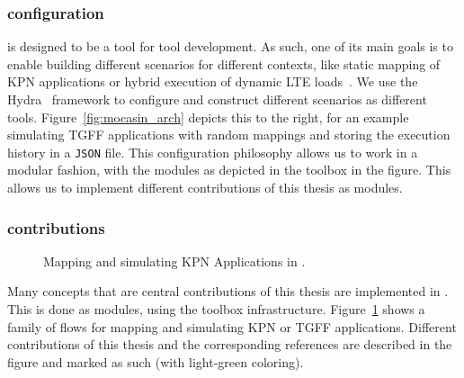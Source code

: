 \subsubsection{configuration}

\mocasin is designed to be a tool for tool development.
As such, one of its main goals is to enable building different scenarios for different contexts, like static mapping of \ac{KPN} applications or hybrid execution of dynamic \ac{LTE} loads~\cite{menard_rapido21}.
We use the Hydra~\cite{yadan2019hydra} framework to configure \mocasin and construct different scenarios as different tools.
Figure~\ref{fig:mocasin_arch} depicts this to the right, for an example simulating \ac{TGFF} applications with random mappings and storing the execution history in a \texttt{JSON} file.
This configuration philosophy allows us to work in a modular fashion, with the modules as depicted in the \mocasin toolbox in the figure.
This allows us to implement different contributions of this thesis as \mocasin modules.

\subsubsection{contributions}

\begin{figure}[h]
	\centering
   \resizebox{0.95\textwidth}{!}{}
	\caption{Mapping and simulating KPN Applications in \mocasin.}
	\label{fig:mocasin_kpn_simulation}
\end{figure}

Many concepts that are central contributions of this thesis are implemented in \mocasin. 
This is done as modules, using the \mocasin toolbox infrastructure. 
Figure~\ref{fig:mocasin_kpn_simulation} shows a family of \mocasin flows for mapping and simulating \ac{KPN} or \ac{TGFF} applications.
Different contributions of this thesis and the corresponding references are described in the figure and marked as such (with light-green coloring).
